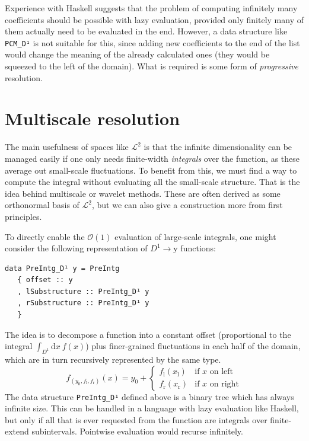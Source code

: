 \documentclass[final,sigplan]{acmart}\settopmatter{printfolios=true,printccs=false,printacmref=false}
\theoremstyle{acmplain}
\theoremstyle{acmdefinition}
\begin{document}
Experience with Haskell suggests that the problem of computing infinitely many coefficients should be possible with lazy evaluation, provided only finitely many of them actually need to be evaluated in the end.
However, a data structure like \lstinline`PCM_D¹` is not suitable for this, since adding new coefficients to the end of the list would change the meaning of the already calculated ones (they would be squeezed to the left of the domain).
What is required is some form of \emph{progressive} resolution.

\section{Multiscale resolution}\label{mulScaleResoIntro}
The main usefulness of spaces like $\mathcal{L}^2$ is that the infinite dimensionality can be managed easily if one only needs finite-width \emph{integrals} over the function, as these average out small-scale fluctuations.
To benefit from this, we must find a way to compute the integral without evaluating all the small-scale structure.
That is the idea behind multiscale or wavelet methods.
These are often derived as some orthonormal basis of $\mathcal{L}^2$, but we can also give a construction more from first principles.

To directly enable the $\mathcal{O}(1)$ evaluation of large-scale integrals, one might consider the following representation of $D^1\to \mathrm{y}$ functions:
\begin{lstlisting}
data PreIntg_D¹ y = PreIntg
   { offset :: y
   , lSubstructure :: PreIntg_D¹ y
   , rSubstructure :: PreIntg_D¹ y
   }
\end{lstlisting}
The idea is to decompose a function into a constant offset (proportional to the integral $\int_{D^1}\!\mathrm{d}x\:f(x)$) plus finer-grained fluctuations in each half of the domain, which are in turn recursively represented by the same type.
\[
  f_{(y_0,f_\mathrm{l},f_\mathrm{r})}(x)
      = y_0 + \begin{cases}
                 f_\mathrm{l}(x_\mathrm{l}) & \text{if $x$ on left}
              \\ f_\mathrm{r}(x_\mathrm{r}) & \text{if $x$ on right}
              \end{cases}
\]
The data structure \lstinline`PreIntg_D¹` defined above is a binary tree which has always infinite size.
This can be handled in a language with lazy evaluation like Haskell,
but only if all that is ever requested from the function are integrals over finite-extend subintervals.
Pointwise evaluation would recurse infinitely.
\end{document}
